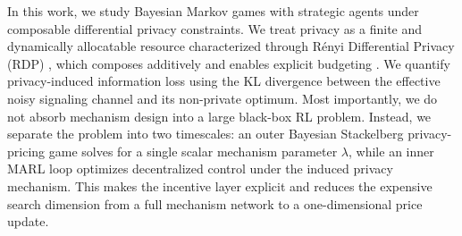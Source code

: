 \documentclass{article}
\begin{document}
In this work, we study Bayesian Markov games with strategic agents under composable differential privacy constraints. We treat privacy as a finite and dynamically allocatable resource characterized through R\'enyi Differential Privacy (RDP) \citep{8049725}, which composes additively and enables explicit budgeting \citep{dwork2025differentially}. We quantify privacy-induced information loss using the KL divergence between the effective noisy signaling channel and its non-private optimum. Most importantly, we do not absorb mechanism design into a large black-box RL problem. Instead, we separate the problem into two timescales: an outer Bayesian Stackelberg privacy-pricing game solves for a single scalar mechanism parameter $\lambda$, while an inner MARL loop optimizes decentralized control under the induced privacy mechanism. This makes the incentive layer explicit and reduces the expensive search dimension from a full mechanism network to a one-dimensional price update.
\end{document}
